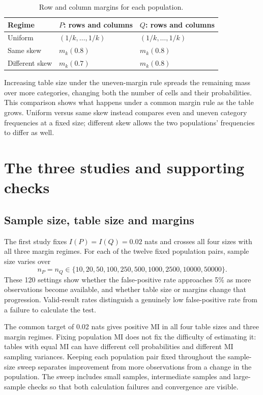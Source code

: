 \begin{table}[htbp]
\centering
\caption{Row and column margins for each population.}
\label{tab:margin-profiles}
\begin{tabular}{@{}lll@{}}
\toprule
Regime & \(P\): rows and columns & \(Q\): rows and columns\\
\midrule
Uniform & \((1/k,\ldots,1/k)\) & \((1/k,\ldots,1/k)\)\\
Same skew & \(m_k(0.8)\) & \(m_k(0.8)\)\\
Different skew & \(m_k(0.7)\) & \(m_k(0.8)\)\\
\bottomrule
\end{tabular}
\end{table}

Increasing table size under the uneven-margin rule spreads the remaining
mass over more categories, changing both the number of cells and their
probabilities. This comparison shows what happens under a common margin
rule as the table grows. Uniform versus same skew instead compares even
and uneven category frequencies at a fixed size; different skew allows the
two populations' frequencies to differ as well.

\section{The three studies and supporting checks}

\subsection{Sample size, table size and margins}

The first study fixes \(I(P)=I(Q)=0.02\) nats and crosses all four sizes
with all three margin regimes. For each of the twelve fixed population
pairs, sample size varies over
\begin{equation}
 n_P=n_Q\in\{10,20,50,100,250,500,1000,2500,10000,50000\}.
 \label{eq:null-sample-grid}
\end{equation}
These 120 settings show whether the false-positive rate approaches 5\%
as more observations become available, and whether table size or margins
change that progression. Valid-result rates distinguish a genuinely low
false-positive rate from a failure to calculate the test.

The common target of 0.02 nats gives positive MI in all four table sizes
and three margin regimes. Fixing population MI does not fix the
difficulty of estimating it: tables with equal MI can have different
cell probabilities and different MI sampling variances. Keeping each
population pair fixed throughout the sample-size sweep separates
improvement from more observations from a change in the population.
The sweep includes small samples, intermediate samples and large-sample
checks so that both calculation failures and convergence are visible.

